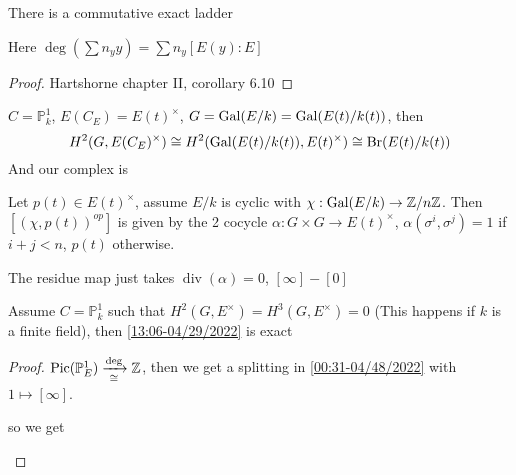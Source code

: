 \documentclass[a4paper,10pt]{article}
\begin{document}
\begin{lemma}\label{08:59-04/28/2022}
There is a commutative exact ladder
\begin{center}
\end{center}
Here $\deg\left(\sum n_yy\right)=\sum n_y[E(y):E]$
\end{lemma}

\begin{proof}
Hartshorne chapter II, corollary 6.10
\end{proof}

\begin{example}
$C=\mathbb P_k^1$, $E(C_E)=E(t)^\times$, $G=\operatorname{Gal}(E/k)=\operatorname{Gal}(E(t)/k(t))$, then
\[H^2(G,E(C_E)^\times)\cong H^2(\operatorname{Gal}(E(t)/k(t)),E(t)^\times)\cong\operatorname{Br}(E(t)/k(t))\]
And our complex is
\begin{center}
\end{center}
Let $p(t)\in E(t)^\times$, assume $E/k$ is cyclic with $\chi:\operatorname{Gal}(E/k)\to\mathbb Z/n\mathbb Z$. Then $[(\chi,p(t))^{op}]$ is given by the 2 cocycle $\alpha:G\times G\to E(t)^\times$, $\alpha(\sigma^i,\sigma^j)=1$ if $i+j<n$, $p(t)$ otherwise.

The residue map just takes $\operatorname{div}(\alpha)=0$, $[\infty]-[0]$
\end{example}

\begin{theorem}
Assume $C=\mathbb P_k^1$ such that $H^2(G,E^\times)=H^3(G,E^\times)=0$ (This happens if $k$ is a finite field), then \eqref{13:06-04/29/2022} is exact
\end{theorem}

\begin{proof}
$\operatorname{Pic}(\mathbb P^1_E)\xrightarrow[\cong]{\deg}\mathbb Z$, then we get a splitting in \eqref{00:31-04/48/2022} with $1\mapsto[\infty]$.

so we get
\begin{center}
\end{center}
\end{proof}
\end{document}
